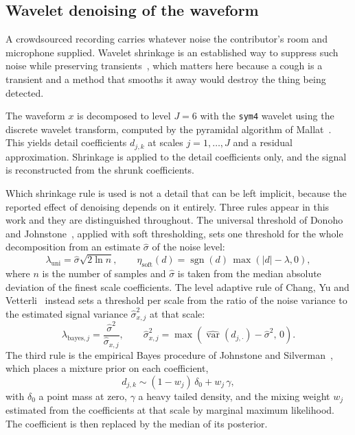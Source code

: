 \documentclass[pdflatex,sn-mathphys-num]{sn-jnl}
\begin{document}
\subsection{Wavelet denoising of the waveform}\label{sec:design-denoise}

A crowdsourced recording carries whatever noise the contributor's room and microphone
supplied. Wavelet shrinkage is an established way to suppress such noise while preserving
transients~\cite{donoho1994}, which matters here because a cough is a transient and a
method that smooths it away would destroy the thing being detected.

The waveform $x$ is decomposed to level $J = 6$ with the \texttt{sym4} wavelet using the
discrete wavelet transform, computed by the pyramidal algorithm of
Mallat~\cite{mallat1989}. This yields detail coefficients $d_{j,k}$ at scales
$j = 1, \dots, J$ and a residual approximation. Shrinkage is applied to the detail
coefficients only, and the signal is reconstructed from the shrunk coefficients.

Which shrinkage rule is used is not a detail that can be left implicit, because the
reported effect of denoising depends on it entirely. Three rules appear in this work and
they are distinguished throughout. The universal threshold of Donoho and
Johnstone~\cite{donoho1994}, applied with soft thresholding, sets one threshold for the
whole decomposition from an estimate $\hat{\sigma}$ of the noise level:
\begin{equation}
\lambda_{\mathrm{uni}} = \hat{\sigma}\sqrt{2\ln n},
\qquad
\eta_{\mathrm{soft}}(d) = \operatorname{sgn}(d)\,\max(|d| - \lambda, 0),
\label{eq:visu}
\end{equation}
where $n$ is the number of samples and $\hat{\sigma}$ is taken from the median absolute
deviation of the finest scale coefficients. The level adaptive rule of Chang, Yu and
Vetterli~\cite{chang2000} instead sets a threshold per scale from the ratio of the noise
variance to the estimated signal variance $\hat{\sigma}_{x,j}^{2}$ at that scale:
\begin{equation}
\lambda_{\mathrm{bayes},j} = \frac{\hat{\sigma}^{2}}{\hat{\sigma}_{x,j}},
\qquad
\hat{\sigma}_{x,j}^{2} = \max\!\left(\widehat{\operatorname{var}}(d_{j,\cdot})
  - \hat{\sigma}^{2},\, 0\right).
\label{eq:bayes}
\end{equation}
The third rule is the empirical Bayes procedure of Johnstone and
Silverman~\cite{johnstone2005}, which places a mixture prior on each coefficient,
\begin{equation}
d_{j,k} \sim (1 - w_j)\,\delta_0 + w_j\,\gamma,
\label{eq:eb}
\end{equation}
with $\delta_0$ a point mass at zero, $\gamma$ a heavy tailed density, and the mixing
weight $w_j$ estimated from the coefficients at that scale by marginal maximum
likelihood. The coefficient is then replaced by the median of its posterior.
\end{document}
